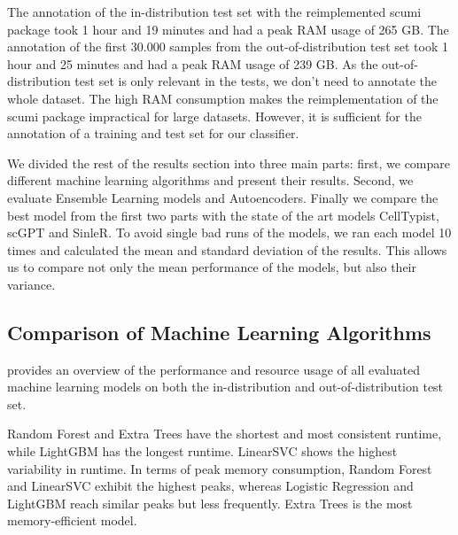 \documentclass[11pt]{article}
\begin{document}
The annotation of the in-distribution test set with the reimplemented scumi package took 1 hour and 19 minutes and had a peak RAM usage of 265 GB. The annotation of the first 30.000 samples from the out-of-distribution test set took 1 hour and 25 minutes and had a peak RAM usage of 239 GB. As the out-of-distribution test set is only relevant in the tests, we don't need to annotate the whole dataset. %
The high RAM consumption makes the reimplementation of the scumi package impractical for large datasets. However, it is sufficient for the annotation of a training and test set for our classifier. %


We divided the rest of the results section into three main parts: first, we compare different machine learning algorithms and present their results. Second, we evaluate Ensemble Learning models and Autoencoders. Finally we compare the best model from the first two parts with the state of the art models CellTypist, scGPT and SinleR. %
To avoid single bad runs of the models, we ran each model 10 times and calculated the mean and standard deviation of the results. This allows us to compare not only the mean performance of the models, but also their variance.

\subsection{Comparison of Machine Learning Algorithms}\label{sec:results:ml}


 provides an overview of the performance and resource usage of all evaluated machine learning models on both the in-distribution and out-of-distribution test set.

Random Forest and Extra Trees have the shortest and most consistent runtime, while LightGBM has the longest runtime. LinearSVC shows the highest variability in runtime. In terms of peak memory consumption, Random Forest and LinearSVC exhibit the highest peaks, whereas Logistic Regression and LightGBM reach similar peaks but less frequently. Extra Trees is the most memory-efficient model. %
\end{document}
